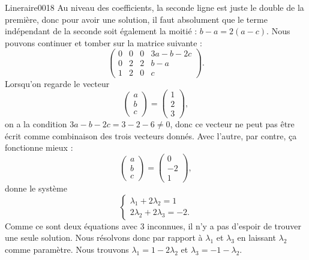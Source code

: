 \begin{corrige}{Lineraire0018}
	Au niveau des coefficients, la seconde ligne est juste le double de la première, donc pour avoir une solution, il faut absolument que le terme indépendant de la seconde soit également la moitié : $b-a=2(a-c)$. Nous pouvons continuer et tomber sur la matrice suivante :
	\begin{equation}
		\left(\begin{array}{ccc|c}
			 0	&	0	&	0	&	3a-b-2c	\\
			  0	&	2	&	2	&	b-a\\
			   1	&	2	&	0	&	c	 
		   \end{array}\right).
	\end{equation}
	Lorsqu'on regarde le vecteur
	\begin{equation}
		\begin{pmatrix}
			a	\\ 
			b	\\ 
			c	
		\end{pmatrix}
		=
		\begin{pmatrix}
			1	\\ 
			2	\\ 
			3	
		\end{pmatrix},
	\end{equation}
	on a la condition $3a-b-2c=3-2-6\neq 0$, donc ce vecteur ne peut pas être écrit comme combinaison des trois vecteurs donnés. Avec l'autre, par contre, ça fonctionne mieux :
	\begin{equation}
		\begin{pmatrix}
			a	\\ 
			b	\\ 
			c	
		\end{pmatrix}=
		\begin{pmatrix}
			0	\\ 
			-2	\\ 
			1	
		\end{pmatrix},
	\end{equation}
	donne le système
	\begin{equation}
		\left\{
		\begin{array}{ll}
			\lambda_1+2\lambda_2=1\\
			2 \lambda_2+2\lambda_3=-2.
		\end{array}
		\right.
	\end{equation}
	Comme ce sont deux équations avec 3 inconnues, il n'y a pas d'espoir de trouver une seule solution. Nous résolvons donc par rapport à $\lambda_1$ et $\lambda_3$ en laissant $\lambda_2$ comme paramètre. Nous trouvons $\lambda_1=1-2\lambda_2$ et $\lambda_3=-1-\lambda_2$.


\end{corrige}

